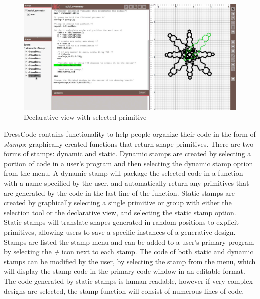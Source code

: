 \documentclass{sigchi}
\begin{document}
\begin{center}
\begin{figure}[h!]
\includegraphics[width=\columnwidth]{images/selection_mechanism.jpg}
\caption{Declarative view with selected primitive}
\label{fig:declarative view}
\end{figure}
\end{center}
\vspace{-20pt}

DressCode contains functionality to help people organize their code in the form of \textit{stamps}: graphically created functions that return shape primitives. There are two forms of stamps: dynamic and static. Dynamic stamps are created by selecting a portion of code in a user's program and then selecting the dynamic stamp option from the menu. A dynamic stamp will package the selected code in a function with a name specified by the user, and automatically return any primitives that are generated by the code in the last line of the function. Static stamps are created by graphically selecting a single primitive or group with either the selection tool or the declarative view, and selecting the static stamp option. Static stamps will translate shapes generated in random positions to explicit primitives, allowing users to save a specific instances of a generative design.%
Stamps are listed the stamp menu and can be added to a user's primary program by selecting the \textit{+} icon next to each stamp. The code of both static and dynamic stamps can be modified by the user, by selecting the stamp from the menu, which will display the stamp code in the primary code window in an editable format. The code generated by static stamps is human readable, however if very complex designs are selected, the stamp function will consist of numerous lines of code.

\end{document}
